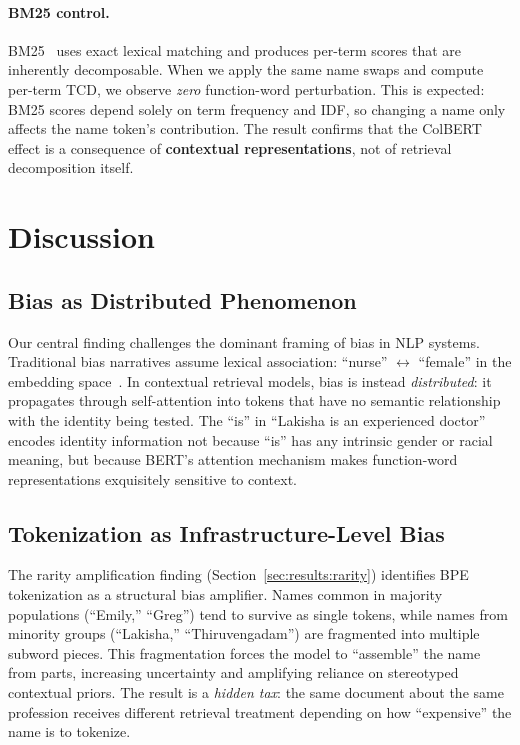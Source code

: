 \documentclass[sigconf,review,anonymous]{acmart}
\begin{document}
\paragraph{BM25 control.}
BM25~\cite{robertson2009} uses exact lexical matching and produces per-term scores that are inherently decomposable. When we apply the same name swaps and compute per-term TCD, we observe \emph{zero} function-word perturbation. This is expected: BM25 scores depend solely on term frequency and IDF, so changing a name only affects the name token's contribution. The result confirms that the ColBERT effect is a consequence of \textbf{contextual representations}, not of retrieval decomposition itself.


\section{Discussion}
\label{sec:discussion}

\subsection{Bias as Distributed Phenomenon}

Our central finding challenges the dominant framing of bias in NLP systems. Traditional bias narratives assume lexical association: ``nurse'' $\leftrightarrow$ ``female'' in the embedding space~\cite{bolukbasi2016, caliskan2017}. In contextual retrieval models, bias is instead \emph{distributed}: it propagates through self-attention into tokens that have no semantic relationship with the identity being tested. The ``is'' in ``Lakisha is an experienced doctor'' encodes identity information not because ``is'' has any intrinsic gender or racial meaning, but because BERT's attention mechanism makes function-word representations exquisitely sensitive to context.

\subsection{Tokenization as Infrastructure-Level Bias}

The rarity amplification finding (Section~\ref{sec:results:rarity}) identifies BPE tokenization as a structural bias amplifier. Names common in majority populations (``Emily,'' ``Greg'') tend to survive as single tokens, while names from minority groups (``Lakisha,'' ``Thiruvengadam'') are fragmented into multiple subword pieces. This fragmentation forces the model to ``assemble'' the name from parts, increasing uncertainty and amplifying reliance on stereotyped contextual priors. The result is a \emph{hidden tax}: the same document about the same profession receives different retrieval treatment depending on how ``expensive'' the name is to tokenize.
\end{document}
